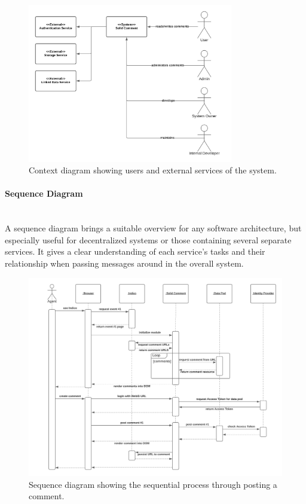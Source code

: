 \begin{figure}[H]
    \centering
    \includegraphics[width=0.8\textwidth]{prototype/graphs/poc-comment-context_diagram.png}
    \caption{Context diagram showing users and external services of the system.}
    \label{fig:poc-comment-context_diagram}
\end{figure}
\vspace{0.5cm}
\paragraph{Sequence Diagram}\mbox{}\\

A sequence diagram brings a suitable overview for any software architecture, but especially useful for decentralized systems or those containing several separate services. It gives a clear understanding of each service’s tasks and their relationship when passing messages around in the overall system.

\begin{figure}[H]
    \centering
    \includegraphics[width=\textwidth]{prototype/graphs/poc-comment-sequence_diagram.png}
    \caption{Sequence diagram showing the sequential process through posting a comment.}
    \label{fig:poc-comment-sequence_diagram}
\end{figure}
\vspace{0.5cm}
